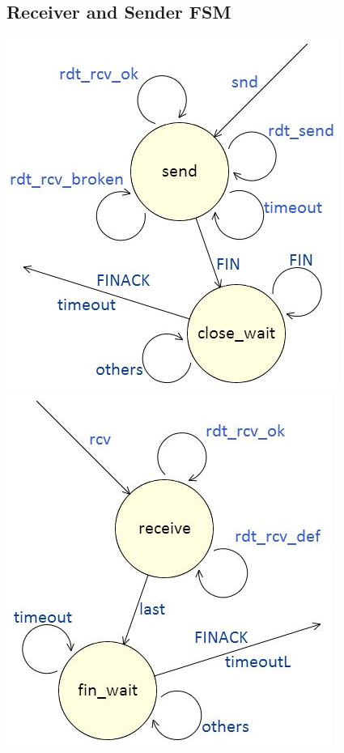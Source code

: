 \documentclass[10pt,a4paper]{article}
\begin{document}
\subsection{Receiver and Sender FSM}
    \begin{center}
        \includegraphics[scale=0.7]{fsmsnd.jpg}
        \; \; \;
        \includegraphics[scale=0.7]{fsmrcv.jpg}
    \end{center}
\end{document}

